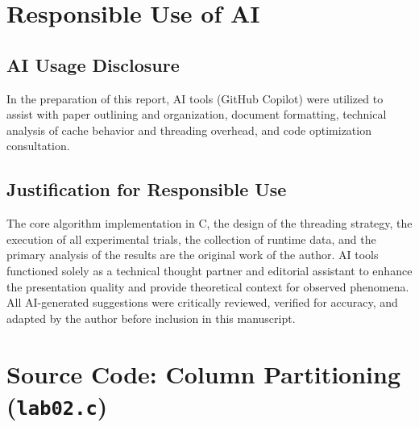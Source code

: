 \documentclass[journal]{IEEEtran}
\begin{document}
\section{Responsible Use of AI}

\subsection{AI Usage Disclosure}
In the preparation of this report, AI tools (GitHub Copilot) were utilized to assist with paper outlining and organization, document formatting, technical analysis of cache behavior and threading overhead, and code optimization consultation.

\subsection{Justification for Responsible Use}
The core algorithm implementation in C, the design of the threading strategy, the execution of all experimental trials, the collection of runtime data, and the primary analysis of the results are the original work of the author. AI tools functioned solely as a technical thought partner and editorial assistant to enhance the presentation quality and provide theoretical context for observed phenomena. All AI-generated suggestions were critically reviewed, verified for accuracy, and adapted by the author before inclusion in this manuscript.

\appendices

\section{Source Code: Column Partitioning (\texttt{lab02.c})}
\end{document}
